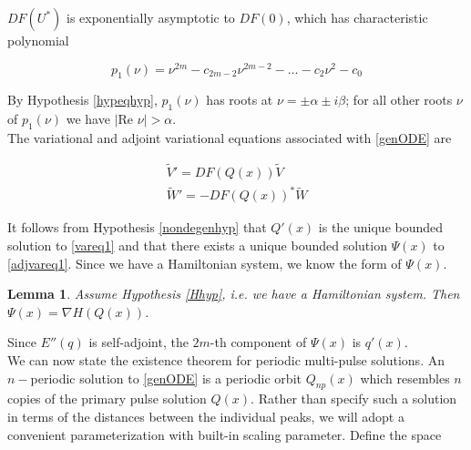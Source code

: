 \documentclass[12pt]{article}
\def\R{{\mathbb R}}
\newtheorem{lemma}{Lemma}
\begin{document}
$DF(U^*)$ is exponentially asymptotic to $DF(0)$, which has characteristic polynomial

\begin{equation}\label{charpolyDF0}
p_1(\nu) = \nu^{2m} - c_{2m-2} \nu^{2m-2} - \dots - c_2 \nu^2 - c_0
\end{equation}

By Hypothesis \ref{hypeqhyp}, $p_1(\nu)$ has roots at $\nu = \pm \alpha \pm i \beta$; for all other roots $\nu$ of $p_1(\nu)$ we have $|\text{Re }\nu| > \alpha$.\\

The variational and adjoint variational equations associated with \eqref{genODE} are

\begin{align}
\tilde{V}' = DF(Q(x))\tilde{V} \label{vareq1} \\
\tilde{W}' = -DF(Q(x))^* \tilde{W} \label{adjvareq1}
\end{align}

It follows from Hypothesis \ref{nondegenhyp} that $Q'(x)$ is the unique bounded solution to \eqref{vareq1} and that there exists a unique bounded solution $\Psi(x)$ to \eqref{adjvareq1}. Since we have a Hamiltonian system, we know the form of $\Psi(x)$.

\begin{lemma}\label{psiform}
Assume Hypothesis \ref{Hhyp}, i.e. we have a Hamiltonian system. Then $\Psi(x) = \nabla H(Q(x))$.
\end{lemma}

Since $E''(q)$ is self-adjoint, the $2m$-th component of $\Psi(x)$ is $q'(x)$.\\






We can now state the existence theorem for periodic multi-pulse solutions. An $n-$periodic solution to \eqref{genODE} is a periodic orbit $Q_{np}(x)$ which resembles $n$ copies of the primary pulse solution $Q(x)$. Rather than specify such a solution in terms of the distances between the individual peaks, we will adopt a convenient parameterization with built-in scaling parameter. Define the space
\end{document}
